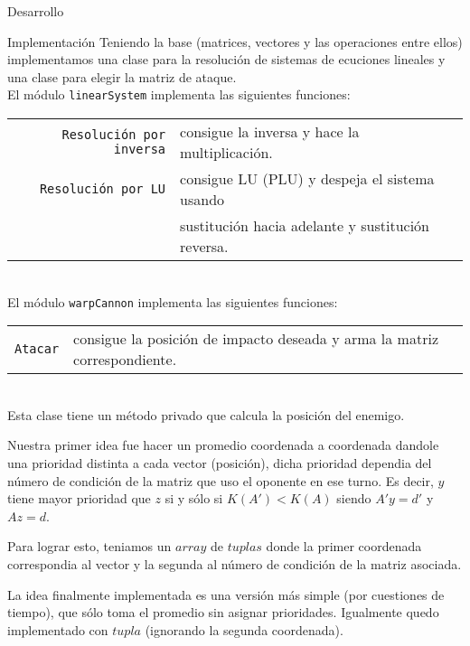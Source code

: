 \begin{section}{Desarrollo}
\begin{subsection}{Implementación}
		Teniendo la base (matrices, vectores y las operaciones entre ellos) implementamos una clase para la resolución de sistemas de ecuciones lineales y una clase para elegir la matriz de ataque.\\
		
		El módulo \texttt{linearSystem} implementa las siguientes funciones:\\
		
		\begin{tabular}{rl}
			\texttt{Resolución por inversa} & consigue la inversa y hace la multiplicación.\\
			\texttt{Resolución por LU} & consigue LU (PLU) y despeja el sistema usando\\
									   & sustitución hacia adelante y sustitución reversa.\\
		\end{tabular}\\
		
		El módulo \texttt{warpCannon} implementa las siguientes funciones:\\
		
		\begin{tabular}{rl}
			\texttt{Atacar} & consigue la posición de impacto deseada y arma la matriz correspondiente.\\
		\end{tabular}\\
		
		Esta clase tiene un método privado que calcula la posición del enemigo.
		
		Nuestra primer idea fue hacer un promedio coordenada a coordenada dandole una prioridad distinta a cada vector (posición), dicha prioridad dependia del número de condición de la matriz que uso el oponente en ese turno. Es decir, $y$ tiene mayor prioridad que $z$ si y sólo si $K(A')<K(A)$ siendo $A'y=d'$ y $Az=d$.
		
		Para lograr esto, teniamos un $array$ de $tuplas$ donde la primer coordenada correspondia al vector y la segunda al número de condición de la matriz asociada.
		
		La idea finalmente implementada es una versión más simple (por cuestiones de tiempo), que sólo toma el promedio sin asignar prioridades. Igualmente quedo implementado con $tupla$ (ignorando la segunda coordenada).
	\end{subsection}
\end{section}

